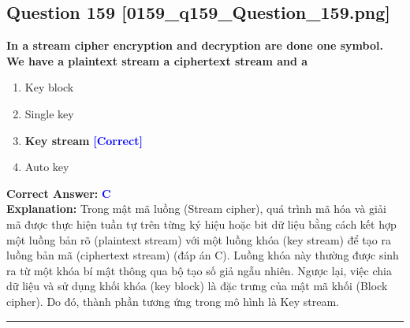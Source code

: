 \documentclass[11pt,a4paper]{article}
\begin{document}
\begin{minipage}{\textwidth}
\subsection*{Question 159 \quad \footnotesize{[0159\_q159\_Question\_159.png]}}
\noindent \textbf{In a stream cipher encryption and decryption are done one symbol. We have a plaintext stream a ciphertext stream and a}

\begin{enumerate}[label=\Alph*.]
    \item Key block
    \item Single key
    \item \textbf{Key stream} \hfill \textcolor{blue}{\textbf{[Correct]}}
    \item Auto key
\end{enumerate}

\noindent \textbf{Correct Answer:} \textcolor{blue}{\textbf{C}} \\[2pt]
\noindent \textbf{Explanation:} Trong mật mã luồng (Stream cipher), quá trình mã hóa và giải mã được thực hiện tuần tự trên từng ký hiệu hoặc bit dữ liệu bằng cách kết hợp một luồng bản rõ (plaintext stream) với một luồng khóa (key stream) để tạo ra luồng bản mã (ciphertext stream) (đáp án C). Luồng khóa này thường được sinh ra từ một khóa bí mật thông qua bộ tạo số giả ngẫu nhiên. Ngược lại, việc chia dữ liệu và sử dụng khối khóa (key block) là đặc trưng của mật mã khối (Block cipher). Do đó, thành phần tương ứng trong mô hình là Key stream.

\par\vspace{0.3cm}
\hrule
\vspace{0.3cm}
\end{minipage}
\end{document}
